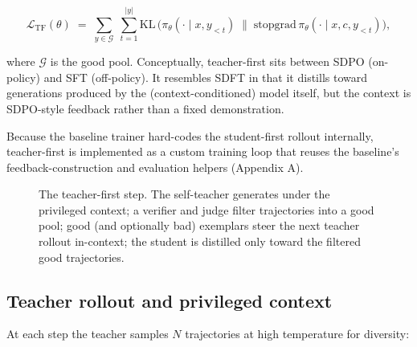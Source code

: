 \[
\mathcal{L}_{\text{TF}}(\theta) \;=\; \sum_{y \in \mathcal{G}} \; \sum_{t=1}^{|y|} \mathrm{KL}\,\Big(\pi_\theta(\cdot \mid x, y_{<t}) \;\big\|\; \mathrm{stopgrad}\,\pi_\theta(\cdot \mid x, c, y_{<t})\Big),
\]

where \(\mathcal{G}\) is the good pool. Conceptually, teacher-first sits between SDPO (on-policy) and SFT (off-policy). It resembles SDFT \cite{r3} in that it distills toward generations produced by the (context-conditioned) model itself, but the context is SDPO-style feedback \cite{r1} rather than a fixed demonstration.

Because the baseline trainer hard-codes the student-first rollout internally, teacher-first is implemented as a custom training loop that reuses the baseline's feedback-construction and evaluation helpers (Appendix A).

\begin{figure}[H]
\centering
{}
\caption{The teacher-first step. The self-teacher generates under the privileged context; a verifier and judge filter trajectories into a good pool; good (and optionally bad) exemplars steer the next teacher rollout in-context; the student is distilled only toward the filtered good trajectories.}
\label{fig:tf-step}
\end{figure}

\subsection{Teacher rollout and privileged context}\label{teacher-rollout-and-privileged-context}

At each step the teacher samples \(N\) trajectories at high temperature for diversity:

